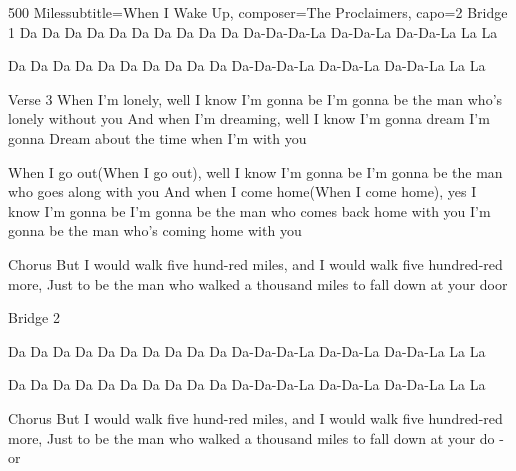 \begin{song}{500 Miles}{subtitle={When I Wake Up}, composer={The Proclaimers}, capo={2}}
Bridge 1
Da Da Da Da          Da Da Da Da      Da Da Da-Da-Da-La Da-Da-La Da-Da-La La La

Da Da Da Da           Da Da Da Da      Da Da Da-Da-Da-La Da-Da-La Da-Da-La La La



Verse 3
When I'm lonely, well I know I'm gonna be
I'm gonna be the man who's lonely without you
And when I'm dreaming, well I know I'm gonna dream
I'm gonna Dream about the time when I'm with you

When I go out(When I go out), well I know I'm gonna be
I'm gonna be the man who goes along with you
And when I come home(When I come home), yes I know I'm gonna be
I'm gonna be the man who comes back home with you
I'm gonna be the man who's coming home with you


Chorus
But I would walk five hund-red miles, and
I would walk five hundred-red  more,
Just to be the man who walked a thousand  miles to
fall down at your door   

Bridge 2


Da Da Da Da          Da Da Da Da      Da Da Da-Da-Da-La Da-Da-La Da-Da-La La La

Da Da Da Da           Da Da Da Da      Da Da Da-Da-Da-La Da-Da-La Da-Da-La La La


Chorus
But I would walk five hund-red miles, and
I would walk five hundred-red  more,
Just to be the man who walked a thousand  miles to
fall down  at  your  do  -  or 
\end{song}

